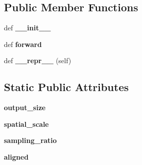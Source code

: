 \subsection*{Public Member Functions}
\begin{DoxyCompactItemize}
\item 
\mbox{\label{classtorchvision_1_1ops_1_1roi__align_1_1RoIAlign_a7e67e82876369e6659208a7c359241e0}} 
def {\bfseries \+\_\+\+\_\+init\+\_\+\+\_\+}
\item 
\mbox{\label{classtorchvision_1_1ops_1_1roi__align_1_1RoIAlign_a231523effb847908e4aa6917008e165e}} 
def {\bfseries forward}
\item 
\mbox{\label{classtorchvision_1_1ops_1_1roi__align_1_1RoIAlign_aa732e394c3ddf666ac17f0685a7eb1bd}} 
def {\bfseries \+\_\+\+\_\+repr\+\_\+\+\_\+} (self)
\end{DoxyCompactItemize}
\subsection*{Static Public Attributes}
\begin{DoxyCompactItemize}
\item 
\mbox{\label{classtorchvision_1_1ops_1_1roi__align_1_1RoIAlign_aa4877b8879b233d7b6100962184cde7e}} 
{\bfseries output\+\_\+size}
\item 
\mbox{\label{classtorchvision_1_1ops_1_1roi__align_1_1RoIAlign_ad87118fc070a762c0a3e3d6b8c0818b5}} 
{\bfseries spatial\+\_\+scale}
\item 
\mbox{\label{classtorchvision_1_1ops_1_1roi__align_1_1RoIAlign_a674a6789c69a9f39cbf0f4ea6b0b46aa}} 
{\bfseries sampling\+\_\+ratio}
\item 
\mbox{\label{classtorchvision_1_1ops_1_1roi__align_1_1RoIAlign_a5e3f362e2d724c5a8c371d304915ddb6}} 
{\bfseries aligned}
\end{DoxyCompactItemize}


